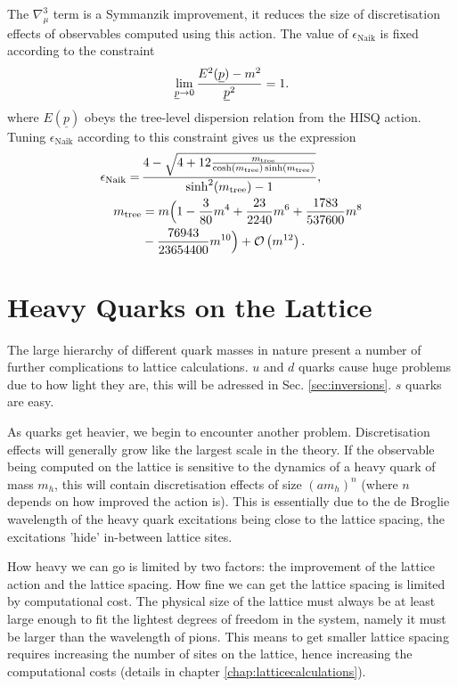     The $\nabla^3_{\mu}$ term is a Symmanzik improvement, it reduces the size of discretisation effects of observables computed using this action. The value of $\epsilon_{\text{Naik}}$ is fixed according to the constraint
    \begin{align}
      \lim_{\underline{p}\to 0} {E^2(\underline{p})-m^2\over \underline{p}^2} = 1.
    \end{align}
    where $E(\underline{p})$ obeys the tree-level dispersion relation from the HISQ action. Tuning $\epsilon_{\text{Naik}}$ according to this constraint gives us the expression
    \begin{align}
      \epsilon_{\text{Naik}} = \,&{ 4 - \sqrt{ 4 + 12 {m_{\text{tree}}\over \cosh(m_{\text{tree}}) \sinh(m_{\text{tree}})} } \over \sinh^2(m_{\text{tree}}) - 1 }, \\
      \nonumber
      m_{\text{tree}} &= m\Big( 1 - {3\over 80}m^4 + {23\over 2240}m^6 + {1783\over 537600 }m^8 \\ &- {76943\over 23654400} m^{10} \Big) + \mathcal{O}\left( m^{12} \right). \nonumber
    \end{align}

    \section{Heavy Quarks on the Lattice}

    The large hierarchy of different quark masses in nature present a number of further complications to lattice calculations. $u$ and $d$ quarks cause huge problems due to how light they are, this will be adressed in Sec. \ref{sec:inversions}. $s$ quarks are easy.

    As quarks get heavier, we begin to encounter another problem. Discretisation effects will generally grow like the largest scale in the theory. If the observable being computed on the lattice is sensitive to the dynamics of a heavy quark of mass $m_h$, this will contain discretisation effects of size $(am_h)^n$ (where $n$ depends on how improved the action is). This is essentially due to the de Broglie wavelength of the heavy quark excitations being close to the lattice spacing, the excitations 'hide' in-between lattice sites.

    How heavy we can go is limited by two factors: the improvement of the lattice action and the lattice spacing. How fine we can get the lattice spacing is limited by computational cost. The physical size of the lattice must always be at least large enough to fit the lightest degrees of freedom in the system, namely it must be larger than the wavelength of pions. This means to get smaller lattice spacing requires increasing the number of sites on the lattice, hence increasing the computational costs (details in chapter \ref{chap:latticecalculations}).

